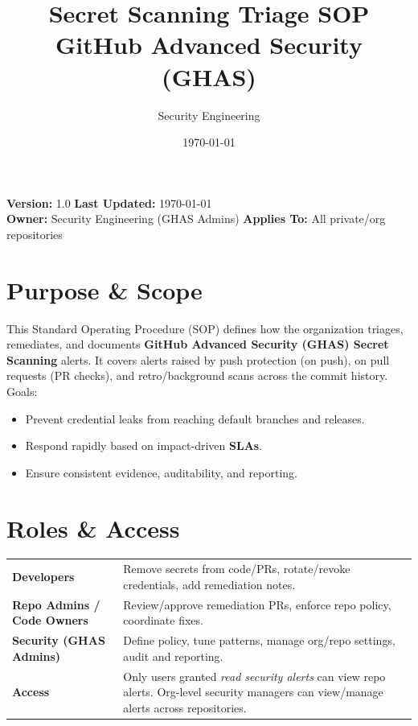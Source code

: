 \documentclass[11pt,a4paper]{article}
\title{\textbf{Secret Scanning Triage SOP}\\[2pt]\large GitHub Advanced Security (GHAS)}
\author{Security Engineering}
\date{\today}
\begin{document}
\maketitle
\begin{callout}
\textbf{Version:} 1.0 \hfill \textbf{Last Updated:} \today\\
\textbf{Owner:} Security Engineering (GHAS Admins) \hfill \textbf{Applies To:} All private/org repositories
\end{callout}

\tableofcontents
\bigskip

\section{Purpose \& Scope}
This Standard Operating Procedure (SOP) defines how the organization triages, remediates, and documents \textbf{GitHub Advanced Security (GHAS) Secret Scanning} alerts. It covers alerts raised by push protection (on push), on pull requests (PR checks), and retro/background scans across the commit history. Goals:
\begin{itemize}[nosep,leftmargin=1.2em]
  \item Prevent credential leaks from reaching default branches and releases.
  \item Respond rapidly based on impact-driven \textbf{SLAs}.
  \item Ensure consistent evidence, auditability, and reporting.
\end{itemize}

\section{Roles \& Access}
\begin{tabularx}{\linewidth}{>{\bfseries}l X}
\toprule
Developers & Remove secrets from code/PRs, rotate/revoke credentials, add remediation notes. \\
Repo Admins / Code Owners & Review/approve remediation PRs, enforce repo policy, coordinate fixes. \\
Security (GHAS Admins) & Define policy, tune patterns, manage org/repo settings, audit and reporting. \\
Access & Only users granted \emph{read security alerts} can view repo alerts. Org-level security managers can view/manage alerts across repositories. \\
\bottomrule
\end{tabularx}
\end{document}
